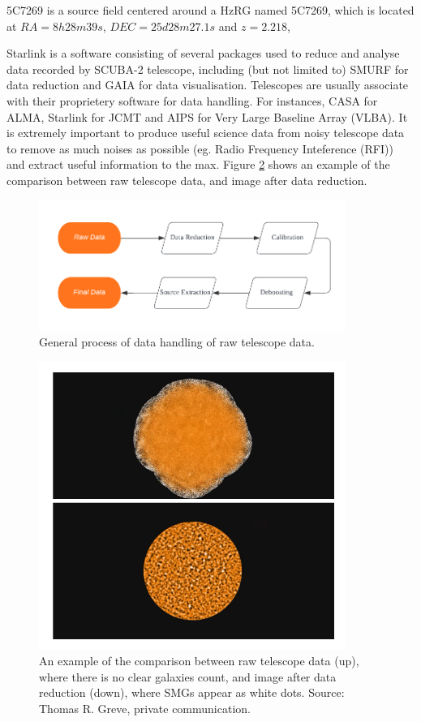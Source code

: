 \documentclass{article}
\begin{document}

\noindent 5C7269 is a source field centered around a HzRG named 5C7269, which is located at $RA = 8h28m39s$, $DEC = 25d28m27.1s$ and $z = 2.218$, 
\medskip

\noindent Starlink is a software consisting of several packages used to reduce and analyse data recorded by SCUBA-2 telescope, including (but not limited to) SMURF for data reduction and GAIA for data visualisation. Telescopes are usually associate with their proprietery software for data handling. For instances, CASA for ALMA, Starlink for JCMT and AIPS for Very Large Baseline Array (VLBA). It is extremely important to produce useful science data from noisy telescope data to remove as much noises as possible (eg. Radio Frequency Inteference (RFI)) and extract useful information to the max. Figure \ref{fig:reducevsunreduce} shows an example of the comparison between raw telescope data, and image after data reduction.

\begin{figure}
    \centering
    \includegraphics[width=100mm]{Flowchart.png}
    \caption{General process of data handling of raw telescope data.}
    \label{fig:flowchart1}
\end{figure}

\begin{figure}
    \centering
    \includegraphics[width=100mm]{reducevsunreduce.png}
    \caption{An example of the comparison between raw telescope data (up), where there is no clear galaxies count, and image after data reduction (down), where SMGs appear as white dots. Source: Thomas R. Greve, private communication.}
    \label{fig:reducevsunreduce}
\end{figure}
\end{document}
